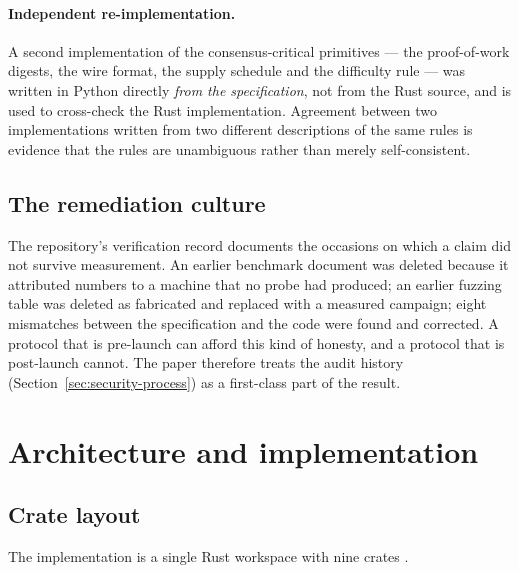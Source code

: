 \documentclass{article}
\begin{document}
\paragraph{Independent re-implementation.} A second implementation of the
consensus-critical primitives --- the proof-of-work digests, the wire format,
the supply schedule and the difficulty rule --- was written in Python directly
\emph{from the specification}, not from the Rust source, and is used to
cross-check the Rust implementation. Agreement between two implementations
written from two different descriptions of the same rules is evidence that the
rules are unambiguous rather than merely self-consistent.

\subsection{The remediation culture}

The repository's verification record \cite{srct-status} documents the
occasions on which a claim did not survive measurement. An earlier benchmark
document was deleted because it attributed numbers to a machine that no probe
had produced; an earlier fuzzing table was deleted as fabricated and replaced
with a measured campaign; eight mismatches between the specification and the
code were found and corrected. A protocol that is pre-launch can afford this
kind of honesty, and a protocol that is post-launch cannot. The paper therefore
treats the audit history (Section~\ref{sec:security-process}) as a first-class
part of the result.


\section{Architecture and implementation}
\label{sec:architecture}

\subsection{Crate layout}

The implementation is a single Rust workspace with nine crates
\cite{srct-repo}.
\end{document}
